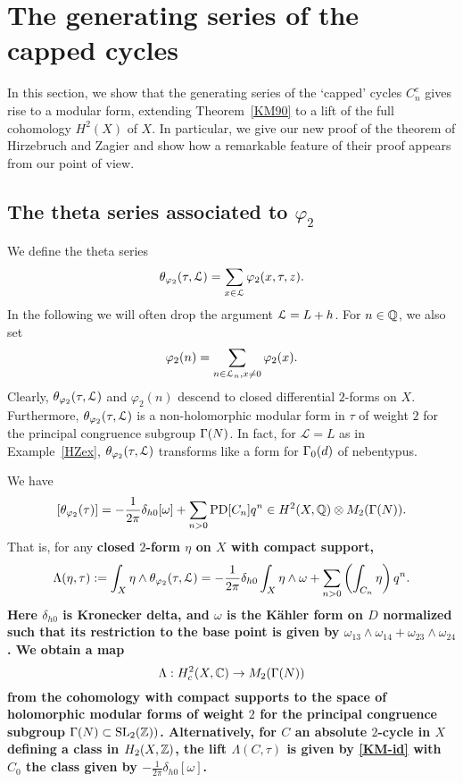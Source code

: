 \section{The generating series of the capped cycles}

In this section, we show that the generating series of the `capped' cycles $C_n^c$ gives rise to a modular form, extending Theorem~\ref{KM90} to a lift of the full cohomology $H^2(X)$ of $X$. In particular, we give our new proof of the theorem of Hirzebruch and Zagier and show how a remarkable feature of their proof appears from our point of view.


\subsection{The theta series associated to $\varphi_2$}

We define the theta series
\[
\theta_{\varphi_2}(\tau,\mathcal{L}) = \sum_{x \in \mathcal{L}} \varphi_2(x,\tau,z).
\]
 In the following we will often drop the argument $\mathcal{L} = L+h$. For $n \in \mathbb{Q}$, we also set 
\[
\varphi_2(n) = \sum_{n \in \mathcal{L}_n, x \ne0} \varphi_2(x).
\]
Clearly, $\theta_{\varphi_2}(\tau,\mathcal{L})$ and $\varphi_2(n)$ descend to closed differential $2$-forms on $X$. Furthermore, $\theta_{\varphi_2}(\tau,\mathcal{L})$ is a non-holomorphic modular form in $\tau$ of weight $2$ for the principal congruence subgroup $\Gamma(N)$. In fact, for $\mathcal{L} = L$ as in Example~\ref{HZex}, $\theta_{\varphi_2}(\tau,\mathcal{L})$ transforms like a form for $\Gamma_0(d)$ of nebentypus. 

\begin{theorem}\label{KM90}
We have
\[
[\theta_{\varphi_2}(\tau)] =  -\frac{1}{2\pi}\delta_{h0} [\omega] + \sum_{n>0} \operatorname{PD}[C_n] q^n \in H^2(X,\mathbb{Q}) \otimes M_2(\Gamma(N)).
\]
That is, for any \bf{closed} $2$-form $\eta$ on $X$ with compact support,
\[
\Lambda(\eta,\tau) := \int_X \eta \wedge \theta_{\varphi_2}(\tau,\mathcal{L})= -\frac{1}{2\pi}\delta_{h0} \int_X \eta \wedge \omega + \sum_{n>0} \left( \int_{C_n} \eta \right)q^n.
\]
Here $\delta_{h0}$ is Kronecker delta, and $\omega$ is the K{\"a}hler form on $D$ normalized such that its restriction to the base point is given by $\omega_{13}\wedge \omega_{14}+\omega_{23}\wedge \omega_{24}$. 
We obtain a map
\begin{equation}
\Lambda: H_c^{2}(X,\mathbb{C}) \to M_{2}(\Gamma(N))
\end{equation}
from the cohomology with compact supports to the space of holomorphic modular forms of weight $2$ for the principal congruence subgroup $\Gamma(N) \subset \operatorname{SL}_2(\mathbb{Z}))$. Alternatively, for $C$ an absolute $2$-cycle in $X$ defining a class in $H_2(X,\mathbb{Z})$, the lift $\Lambda(C,\tau)$ is given by \eqref{KM-id} with $C_0$ the class given by $-\frac{1}{2\pi}\delta_{h0} [\omega]$.
\end{theorem}


